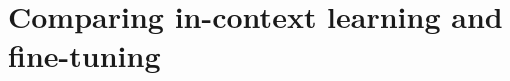 \section{Comparing in-context learning and fine-tuning}

\begin{enumerate}[label={4.\alph*}]
    
    
    
\end{enumerate}